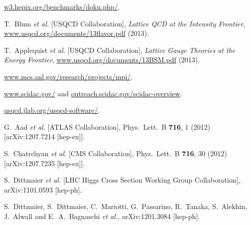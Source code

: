 
\begin{thebibliography}{99}

  
\url{w3.hepix.org/benchmarks/doku.php/}.

T.~Blum {\em et al.} [USQCD Collaboration],
{\em Lattice QCD at the Intensity Frontier},
\url{www.usqcd.org/documents/13flavor.pdf} (2013).

T.~Applequist {\em et al.} [USQCD Collaboration],
{\em Lattice Gauge Theories at the Energy Frontier},
\url{www.usqcd.org/documents/13BSM.pdf} (2013).

\url{www.mcs.anl.gov/research/projects/mpi/}.

\url{www.scidac.gov/} and \url{outreach.scidac.gov/scidac-overview}.
  
\url{usqcd.jlab.org/usqcd-software/}.


  G.~Aad {\it et al.}  [ATLAS Collaboration],
  Phys.\ Lett.\ B {\bf 716}, 1 (2012)
  [arXiv:1207.7214 [hep-ex]].

  S.~Chatrchyan {\it et al.}  [CMS Collaboration],
  Phys.\ Lett.\ B {\bf 716}, 30 (2012)
  [arXiv:1207.7235 [hep-ex]].

  S.~Dittmaier {\it et al.}  [LHC Higgs Cross Section Working Group Collaboration],
  arXiv:1101.0593 [hep-ph].

  S.~Dittmaier, S.~Dittmaier, C.~Mariotti, G.~Passarino, R.~Tanaka, S.~Alekhin, J.~Alwall and E.~A.~Bagnaschi {\it et al.},
  arXiv:1201.3084 [hep-ph].


\end{thebibliography}
